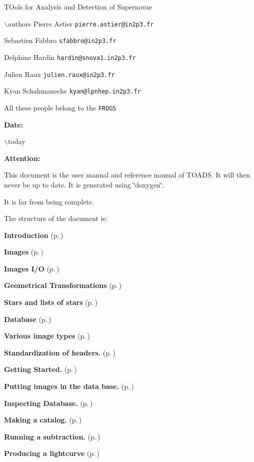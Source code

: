  TOols for Analysis and Detection of Supernovae

$\backslash$authors Pierre Astier {\tt pierre.astier@in2p3.fr}\par
 Sebastien Fabbro {\tt sfabbro@in2p3.fr}\par
 Delphine Hardin {\tt hardin@snova1.in2p3.fr}\par
 Julien Raux {\tt julien.raux@in2p3.fr}\par
 Kyan Schahmaneche {\tt kyan@lpnhep.in2p3.fr}\par
 All these people belong to the {\tt FROGS} \par


\begin{Desc}
\item[{\bf Date: }]\par
$\backslash$today

\end{Desc}
\begin{Desc}
\item[{\bf Attention: }]\par
This document is the user manual and reference manual of TOADS.  It will then never be up to date. It is generated using \char`\"{}doxygen\char`\"{}.\par
 It is far from being complete.

\end{Desc}
The structure of the document is:

\begin{CompactItemize}
 \item 
 {\bf Introduction} {\rm (p.\,\pageref{introduction})} \item 
 {\bf Images} {\rm (p.\,\pageref{images})} \item 
 {\bf Images I/O} {\rm (p.\,\pageref{imageio})} \item 
 {\bf Geometrical Transformations} {\rm (p.\,\pageref{geomtransfo})} \item 
 {\bf Stars and lists of stars} {\rm (p.\,\pageref{starlists})} \item 
 {\bf Database} {\rm (p.\,\pageref{database})} \item 
 {\bf Various image types} {\rm (p.\,\pageref{reducedimage})} \item 
 {\bf Standardization of headers.} {\rm (p.\,\pageref{fitstoad})} \item 
 {\bf Getting Started.} {\rm (p.\,\pageref{gettingstarted})} \begin{CompactItemize}
 \item 
 {\bf Putting images in the data base.} {\rm (p.\,\pageref{installing_images})}  \item 
 {\bf Inspecting Database.} {\rm (p.\,\pageref{inspecting_database})}  \item 
 {\bf Making a catalog.} {\rm (p.\,\pageref{cataloging})} \end{CompactItemize}
 \item 
 {\bf Running a subtraction.} {\rm (p.\,\pageref{subtracting})} \item 
 {\bf Producing a lightcurve} {\rm (p.\,\pageref{lightcurve})} \end{CompactItemize}


